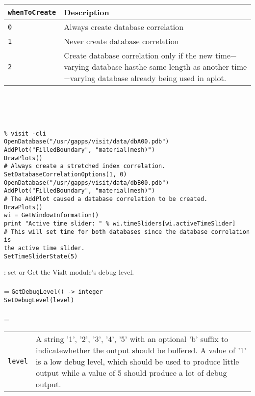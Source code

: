 \documentclass[10pt,a4paper]{report}
\begin{document}
\begin{tabular}{|l|p{9cm}|}
\hline
\verb!whenToCreate! & Description \\
\hline \hline
\verb!0! & Always create database correlation \\
\verb!1! & Never create database correlation \\
\verb!2! & Create database correlation only if the new time$-$varying database hasthe same length as another time$-$varying database already being used in aplot. \\
\hline
\end{tabular} \\[-2mm]
\\[-3mm] 

\\[-6mm]
\begin{verbatim}% visit -cli
OpenDatabase("/usr/gapps/visit/data/dbA00.pdb")
AddPlot("FilledBoundary", "material(mesh)")
DrawPlots()
# Always create a stretched index correlation.
SetDatabaseCorrelationOptions(1, 0)
OpenDatabase("/usr/gapps/visit/data/dbB00.pdb")
AddPlot("FilledBoundary", "material(mesh)")
# The AddPlot caused a database correlation to be created.
DrawPlots()
wi = GetWindowInformation()
print "Active time slider: " % wi.timeSliders[wi.activeTimeSlider]
# This will set time for both databases since the database correlation is
the active time slider.
SetTimeSliderState(5)
\end{verbatim}
\newpage


{}
: set or Get the VisIt module's debug level.\\[-3mm]

 \\ 
\hangindent=\parindent 
\verb!GetDebugLevel() -> integer!\\ 
\verb!SetDebugLevel(level)!\\ [-3mm]

 \\ 
\hangindent=\parindent 
\begin{tabular}{lp{9cm}}
\verb!level! & A string '1', '2', '3', '4', '5' with an optional 'b' suffix to indicatewhether the output should be buffered. A value of '1' is a low debug level, which should be used to produce little output while a value of 5 should produce a lot of debug output. \\
\end{tabular} \\[-2mm]
\end{document}

